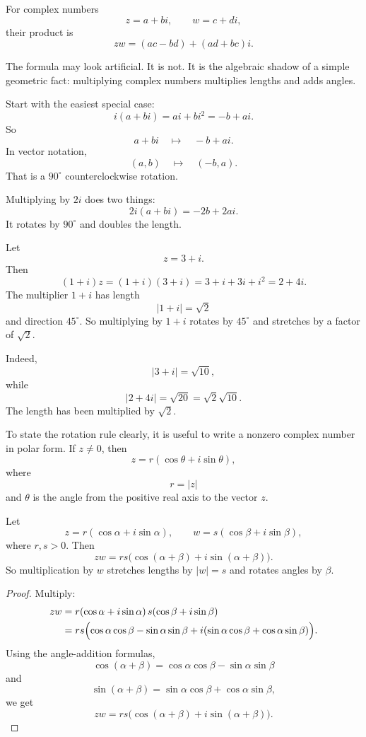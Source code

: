 \begin{definition}
For complex numbers
\[
    z=a+bi,\qquad w=c+di,
\]
their product is
\[
    zw=(ac-bd)+(ad+bc)i.
\]
\end{definition}

The formula may look artificial.  It is not.  It is the algebraic shadow of a simple
geometric fact: multiplying complex numbers multiplies lengths and adds angles.

Start with the easiest special case:
\[
    i(a+bi)=ai+bi^2=-b+ai.
\]
So
\[
    a+bi
    \quad\longmapsto\quad
    -b+ai.
\]
In vector notation,
\[
    (a,b)
    \quad\longmapsto\quad
    (-b,a).
\]
That is a \(90^\circ\) counterclockwise rotation.

Multiplying by \(2i\) does two things:
\[
    2i(a+bi)=-2b+2ai.
\]
It rotates by \(90^\circ\) and doubles the length.

\begin{example}[Multiplying by \(1+i\)]
Let
\[
    z=3+i.
\]
Then
\[
    (1+i)z=(1+i)(3+i)=3+i+3i+i^2=2+4i.
\]
The multiplier \(1+i\) has length
\[
    |1+i|=\sqrt2
\]
and direction \(45^\circ\).  So multiplying by \(1+i\) rotates by \(45^\circ\) and
stretches by a factor of \(\sqrt2\).

Indeed,
\[
    |3+i|=\sqrt{10},
\]
while
\[
    |2+4i|=\sqrt{20}=\sqrt2\sqrt{10}.
\]
The length has been multiplied by \(\sqrt2\).
\end{example}

To state the rotation rule clearly, it is useful to write a nonzero complex number in
polar form.  If \(z\neq0\), then
\[
    z=r(\cos\theta+i\sin\theta),
\]
where
\[
    r=|z|
\]
and \(\theta\) is the angle from the positive real axis to the vector \(z\).

\begin{theorem}
Let
\[
    z=r(\cos\alpha+i\sin\alpha),
    \qquad
    w=s(\cos\beta+i\sin\beta),
\]
where \(r,s>0\).  Then
\[
    zw
    =
    rs\bigl(\cos(\alpha+\beta)+i\sin(\alpha+\beta)\bigr).
\]
So multiplication by \(w\) stretches lengths by \(|w|=s\) and rotates angles by
\(\beta\).
\end{theorem}

\begin{proof}
Multiply:
\[
\begin{aligned}
zw
&=
r(\cos\alpha+i\sin\alpha)\,
s(\cos\beta+i\sin\beta)\\
&=
rs\Bigl(
\cos\alpha\cos\beta
-\sin\alpha\sin\beta
+i(\sin\alpha\cos\beta+\cos\alpha\sin\beta)
\Bigr).
\end{aligned}
\]
Using the angle-addition formulas,
\[
    \cos(\alpha+\beta)
    =
    \cos\alpha\cos\beta-\sin\alpha\sin\beta
\]
and
\[
    \sin(\alpha+\beta)
    =
    \sin\alpha\cos\beta+\cos\alpha\sin\beta,
\]
we get
\[
    zw
    =
    rs\bigl(\cos(\alpha+\beta)+i\sin(\alpha+\beta)\bigr).
\]
\end{proof}

